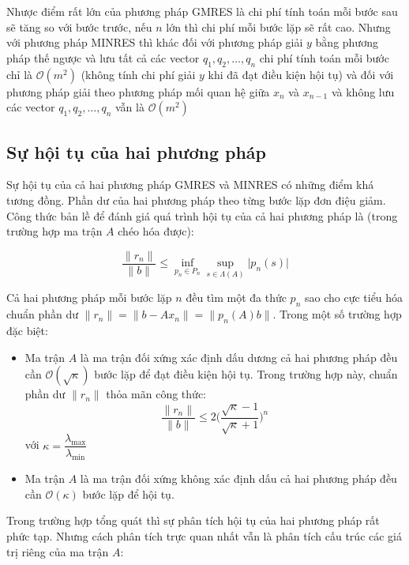 \documentclass[14pt, a4paper]{article}
\numberwithin{equation}{section}
\numberwithin{algorithm}{section}
\numberwithin{figure}{section}
\numberwithin{dl}{section}
\numberwithin{md}{section}
\numberwithin{bd}{section}
\numberwithin{dn}{section}
\numberwithin{hq}{section}
\begin{document}
Nhược điểm rất lớn của phương pháp GMRES là chi phí tính toán mỗi bước sau sẽ tăng so với bước trước, nếu $n$ lớn thì chi phí mỗi bước lặp sẽ rất cao. Nhưng với phương pháp MINRES thì khác đối với phương pháp giải $y$ bằng phương pháp thế ngược và lưu tất cả các vector $q_1, q_2, \dots, q_n$ chi phí tính toán mỗi bước chỉ là $\mathcal{O}(m^2)$ (không tính chi phí giải $y$ khi đã đạt điều kiện hội tụ) và đối với phương pháp giải theo phương pháp mối quan hệ giữa $x_n$ và $x_{n-1}$ và không lưu các vector $q_1, q_2, \dots, q_n$ vẫn là $\mathcal{O}(m^2)$

\subsection{Sự hội tụ của hai phương pháp}

Sự hội tụ của cả hai phương pháp GMRES và MINRES có những điểm khá tương đồng. Phần dư của hai phương pháp theo từng bước lặp đơn điệu giảm. Công thức bản lề để đánh giá quá trình hội tụ của cả hai phương pháp là (trong trường hợp ma trận $A$ chéo hóa được):

\begin{equation}
    \dfrac{\lVert r_n \rVert}{\lVert b \rVert} \leq \inf_{p_n \in P_n} \sup_{s \in \Lambda(A)} \lvert p_n(s) \rvert
\end{equation}

Cả hai phương pháp mỗi bước lặp $n$ đều tìm một đa thức $p_n$ sao cho cực tiểu hóa chuẩn phần dư $\lVert r_n \rVert=\lVert b - Ax_n \rVert=\lVert p_n(A)b \rVert$. Trong một số trường hợp đặc biệt:

\begin{itemize}
    \item Ma trận $A$ là ma trận đối xứng xác định dấu dương cả hai phương pháp đều cần $\mathcal{O}(\sqrt{\kappa})$ bước lặp để đạt điều kiện hội tụ. Trong trường hợp này, chuẩn phần dư $\lVert r_n \lVert$ thỏa mãn công thức:
    \begin{equation}
        \dfrac{\lVert r_n \rVert }{\lVert b \rVert} \leq 2\Big(\dfrac{\sqrt{\kappa} - 1}{\sqrt{\kappa} + 1}\Big)^n
    \end{equation}
    với $\kappa=\dfrac{\lambda_{\max}}{\lambda_{\min}}$
    \item Ma trận $A$ là ma trận đối xứng không xác định dấu cả hai phương pháp đều cần $\mathcal{O}(\kappa)$ bước lặp để hội tụ.
\end{itemize}

Trong trường hợp tổng quát thì sự phân tích hội tụ của hai phương pháp rất phức tạp. Nhưng cách phân tích trực quan nhất vẫn là phân tích cấu trúc các giá trị riêng của ma trận $A$:
\end{document}
